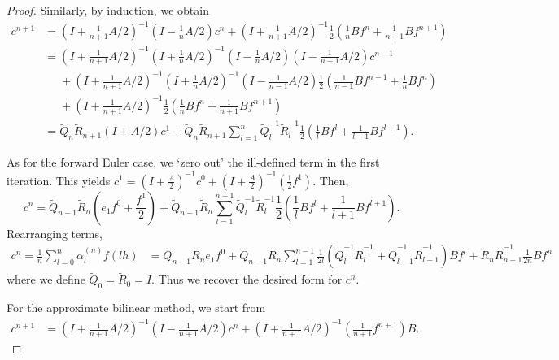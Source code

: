 \documentclass{article}
\theoremstyle{definition}
\newcommand{\pr}[1]{ \left( #1 \right) }
\begin{document}
\begin{proof}
Similarly, by induction, we obtain
\begin{equation*}
    \begin{aligned}
    c^{n+1} 
    &= \pr{ I + \frac{1}{n+1}A/2 }^{-1} \pr{ I - \frac{1}{n}A/2 } c^n + \pr{ I + \frac{1}{n+1}A/2 }^{-1} \frac{1}{2} \pr{\frac{1}{n}Bf^{n} + \frac{1}{n+1}Bf^{n+1} }\\
    &= \pr{ I + \frac{1}{n+1}A/2 }^{-1} \pr{ I + \frac{1}{n}A/2 }^{-1} \pr{ I - \frac{1}{n}A/2 } \pr{ I - \frac{1}{n - 1}A/2 } c^{n-1}\\
    &\phantom{=}+ \pr{ I + \frac{1}{n+1}A/2 }^{-1} \pr{ I + \frac{1}{n}A/2 }^{-1}\pr{ I - \frac{1}{n - 1}A/2 } \frac{1}{2} \pr{\frac{1}{n-1}Bf^{n-1} + \frac{1}{n}Bf^{n} }\\
    &\phantom{=}+ \pr{ I + \frac{1}{n+1}A/2 }^{-1} \frac{1}{2} \pr{\frac{1}{n}Bf^{n} + \frac{1}{n+1}Bf^{n+1} }\\
    &= \tilde{Q}_n \tilde{R}_{n+1} \pr{I+A/2} c^1 + 
    \tilde{Q}_{n} \tilde{R}_{n+1} \sum_{l=1}^{n} \tilde{Q}_l^{-1} \tilde{R}_l^{-1}  \frac{1}{2}\pr{\frac{1}{l}Bf^l + \frac{1}{l+1}Bf^{l+1}}.
    \end{aligned}
\end{equation*}

As for the forward Euler case, we `zero out' the ill-defined term in the first iteration. This yields $c^1 = \pr{I+\frac{A}{2}}^{-1}c^0 + \pr{I+\frac{A}{2}}^{-1}\pr{\frac{1}{2}f^1}$. 
Then,
\begin{equation*} 
    c^n =
    \tilde{Q}_{n-1}\tilde{R}_{n} \pr{e_1f^0
    +\frac{f^1}{2}}
    +\tilde{Q}_{n-1}\tilde{R}_{n} \sum_{l=1}^{n-1} \tilde{Q}_l^{-1} \tilde{R}_l^{-1}  \frac{1}{2}\pr{\frac{1}{l}Bf^l + \frac{1}{l+1}Bf^{l+1}}.
\end{equation*}
Rearranging terms, 
\begin{align}\label{eq:bilin_numsol}
    c^n 
    = \frac{1}{n} \sum_{l=0}^n \alpha^{(n)}_l f(lh)
    &=
    \tilde{Q}_{n-1}\tilde{R}_{n}e_1f^0
    + \tilde{Q}_{n-1}\tilde{R}_{n}
    \sum_{l=1}^{n-1} \frac{1}{2l}
    \pr{
    \tilde{Q}_l^{-1} \tilde{R}_l^{-1} 
    + \tilde{Q}_{l-1}^{-1} \tilde{R}_{l-1}^{-1} 
    }Bf^l
    + \tilde{R}_n \tilde{R}_{n-1}^{-1} \frac{1}{2n} B f^n
\end{align}
where we define $\tilde{Q}_0=\tilde{R}_0=I$. Thus we recover the desired form for $c^n$. 

For the approximate bilinear method, we start from
\begin{align*}
    c^{n+1} &= \pr{I + \frac{1}{n+1}A/2}^{-1}\pr{I - \frac{1}{n+1}A/2}c^n + \pr{I + \frac{1}{n+1}A/2}^{-1} \pr{\frac{1}{n+1}f^{n+1}}B.
\end{align*}


\end{proof}
\end{document}
